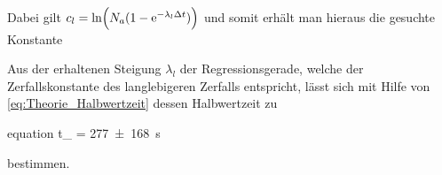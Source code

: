 	

    
    Dabei gilt $c_{l} = \Ln{N_{a}(1 - \E{-\lambda_{l}\Delta t})}$ und somit erhält man hieraus
    die gesuchte Konstante
   	
   	Aus der erhaltenen Steigung $\lambda_{l}$ der Regressionsgerade, welche der 
   	Zerfallskonstante des langlebigeren Zerfalls entspricht, lässt sich mit 
   	Hilfe von \cref{eq:Theorie_Halbwertzeit} dessen Halbwertzeit zu
  	\begin{empheq}{equation}
  		t_{} =  \SI{277(168)}{\second}
  	\end{empheq}
    bestimmen.
    
     
     
     
   